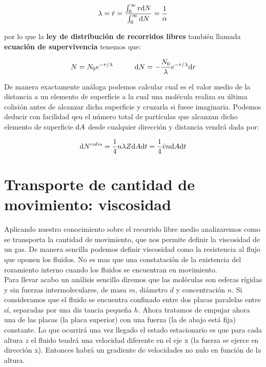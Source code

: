\documentclass[12pt,a4paper,oneside]{book}
\begin{document}
\begin{equation}
\lambda = \bar{r} = \dfrac{\int_{0}^{\infty} r \mathrm{d} N}{\int_{0}^{\infty} \mathrm{d} N} = \dfrac{1}{\alpha}
\end{equation}

por lo que la \textbf{ley de distribución de recorridos libres} también llamada \textbf{ecuación de supervivencia} tenemos que:

\begin{equation}
N = N_0 e^{-r/\lambda} \quad \quad \quad \mathrm{d} N = - \dfrac{N_0}{\lambda} e^{-r / \lambda} \mathrm{d} r
\end{equation}

De manera exactamente análoga podemos calcular cual es el valor medio de la distancia a un elemento de superficie a la cual una molécula realiza su última colisión antes de alcanzar dicha superficie y cruzarla si fuese imaginaria. Podemos deducir con facilidad qeu el número total de partículas que alcanzan dicho elemento de superficie $\mathrm{d} A$ desde cualquier dirección y distancia vendrá dada por:

\begin{equation}
\mathrm{d} N^{colis} = \dfrac{1}{4} n \lambda Z \mathrm{d} A \mathrm{d} t = \dfrac{1}{4} \bar{v} n \mathrm{d} A \mathrm{d} t
\end{equation}

\section{Transporte de cantidad de movimiento: viscosidad}

Aplicando nuestro conocimiento sobre el recorrido libre medio analizaremos como se transporta la cantidad de movimiento, que nos permite definir la viscosidad de un gas. De manera sencilla podemos definir viscosidad como la resistencia al flujo que oponen los fluidos. No es mas que una constatación de la existencia del rozamiento interno cuando los fluidos se encuentran en movimiento. \\

Para llevar acabo un análisis sencillo diremos que las moléculas son esferas rígidas y sin fuerzas intermoleculares, de masa $m$, diámetro $d$ y concentración $n$. Si consideramos que el fluido se encuentra confinado entre dos placas paralelas entre sí, separadas por una dis tancia pequeña $h$. Ahora tratamos de empujar ahora una de las placas (la placa superior) con una fuerza (la de abajo está fija) constante. Lo que ocurrirá una vez llegado el estado estacionario es que para cada altura $z$ el fluido tendrá una velocidad diferente en el eje x (la fuerza se ejerce en dirección x). Entonces habrá un gradiente de velocidades no nulo en función de la altura.\\
\end{document}
